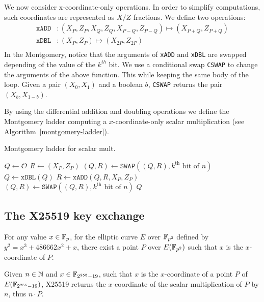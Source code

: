 We now consider x-coordinate-only operations. In order to simplify computations,
such coordinates are represented as $X/Z$ fractions. We define two operations:
\begin{align*}
\texttt{xADD} &: (X_P, Z_P, X_Q , Z_Q, X_{P-Q}, Z_{P-Q}) \mapsto (X_{P+Q}, Z_{P+Q})\\
\texttt{xDBL} &: (X_P, Z_P) \mapsto (X_{2P}, Z_{2P})\\
\end{align*}
In the Montgomery, notice that the arguments of \texttt{xADD} and \texttt{xDBL}
are swapped depending of the value of the $k^{th}$ bit. We use a conditional
swap \texttt{CSWAP} to change the arguments of the above function. This  while keeping the same body of the loop.
Given a pair $(X_0, X_1)$ and a boolean $b$, \texttt{CSWAP} returns the pair
$(X_b, X_{1-b})$.

By using the differential addition and doubling operations we define the Montgomery ladder
computing a $x$-coordinate-only scalar multiplication (see Algorithm~\ref{montgomery-ladder}).
\begin{algorithm}
\caption{Montgomery ladder for scalar mult.}
\label{montgomery-ladder}
\begin{algorithmic}
\STATE $Q \leftarrow \mathcal{O}$
\STATE $R \leftarrow (X_P,Z_P)$
  \STATE $(Q,R) \leftarrow \texttt{SWAP}((Q,R), k^{\text{th}}\text{ bit of }n)$
  \STATE $Q \leftarrow \texttt{xDBL}(Q)$
  \STATE $R \leftarrow \texttt{xADD}(Q,R,X_P,Z_P)$
  \STATE $(Q,R) \leftarrow \texttt{SWAP}((Q,R), k^{\text{th}}\text{ bit of }n)$
\ENDFOR
\RETURN $Q$
\end{algorithmic}
\end{algorithm}

\subsection{The X25519 key exchange}
\label{preliminaries:A}

For any value $x \in \mathbb{F}_{p}$, for the elliptic curve $E$ over $\mathbb{F}_{p^2}$
defined by $y^2 = x^3 + 486662 x^2 + x$, there exist a point $P$ over $E(\mathbb{F}_{p^2})$
such that $x$ is the $x$-coordinate of $P$.

Given $n \in \mathbb{N}$ and $x \in \mathbb{F}_{2^{255}-19}$, such that $x$ is the $x$-coordinate of
a point $P$ of $E(\mathbb{F}_{2^{255}-19})$, X25519 returns the $x$-coordinate of the
scalar multiplication of $P$ by $n$, thus $n \cdot P$.


